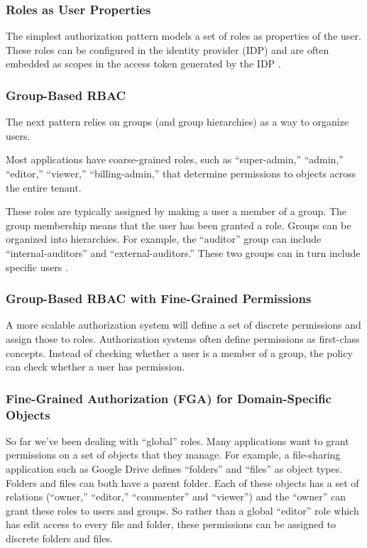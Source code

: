 \subsubsection{Roles as User Properties}

The simplest authorization pattern models a set of roles as properties of the user. These roles can be configured in the identity provider (IDP) and are often embedded as scopes in the access token generated by the IDP \autocite{Gazitt2023}.

\subsubsection{Group-Based RBAC}

The next pattern relies on groups (and group hierarchies) as a way to organize users.

Most applications have coarse-grained roles, such as “super-admin,” “admin,”  “editor,” “viewer,” “billing-admin,” that determine permissions to objects across the entire tenant.

These roles are typically assigned by making a user a member of a group. The group membership means that the user has been granted a role. Groups can be organized into hierarchies. For example, the “auditor” group can include “internal-auditors” and “external-auditors.” These two groups can in turn include specific users \autocite{Gazitt2023}.

\subsubsection{Group-Based RBAC with Fine-Grained Permissions}

A more scalable authorization system will define a set of discrete permissions and assign those to roles. Authorization systems often define permissions as first-class concepts. Instead of checking whether a user is a member of a group, the policy can check whether a user has permission.

\subsubsection{Fine-Grained Authorization (FGA) for Domain-Specific Objects}

So far we’ve been dealing with “global” roles. Many applications want to grant permissions on a set of objects that they manage. For example, a file-sharing application such as Google Drive defines “folders” and “files” as object types. Folders and files can both have a parent folder. Each of these objects has a set of relations (“owner,” “editor,” “commenter” and “viewer”) and the “owner” can grant these roles to users and groups. So rather than a global “editor” role which has edit access to every file and folder, these permissions can be assigned to discrete folders and files.


